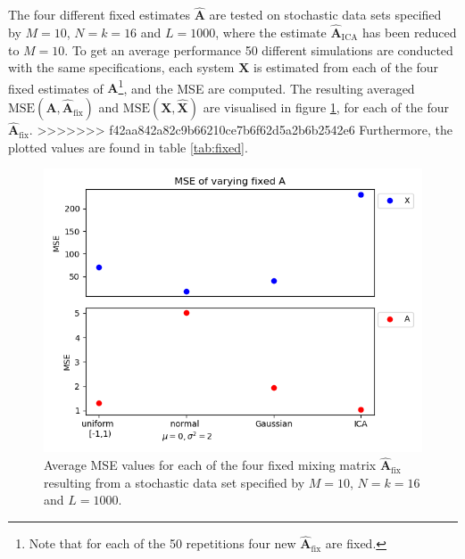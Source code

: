 The four different fixed estimates $\hat{\mathbf{A}}$ are tested on stochastic data sets specified by $M = 10$, $N = k = 16$ and $L = 1000$, where the estimate $\hat{\mathbf{A}}_{\text{ICA}}$ has been reduced to $M = 10$.
To get an average performance 50 different simulations are conducted with the same specifications, each system $\mathbf{X}$ is estimated from each of the four fixed estimates of $\mathbf{A}$\footnote{Note that for each of the 50 repetitions four new $\hat{\mathbf{A}}_{\text{fix}}$ are fixed.}, and the MSE are computed. 
The resulting averaged $\text{MSE}(\mathbf{A}, \hat{\mathbf{A}}_{\text{fix}})$ and $\text{MSE}(\mathbf{X}, \hat{\mathbf{X}})$ are visualised in figure \ref{fig:vary_A}, for each of the four $\hat{\mathbf{A}}_{\text{fix}}$. 
>>>>>>> f42aa842a82c9b66210ce7b6f62d5a2b6b2542e6
Furthermore, the plotted values are found in table \ref{tab:fixed}.
\begin{figure}[H]
\centering
\includegraphics[scale=0.5]{figures/ch_6/A_fix.png}
\caption{Average MSE values for each of the four fixed mixing matrix $\hat{\mathbf{A}}_{\text{fix}}$ resulting from a stochastic data set specified by $M=10$, $N=k=16$ and $L=1000$.}
\label{fig:vary_A}
\end{figure}
\noindent

